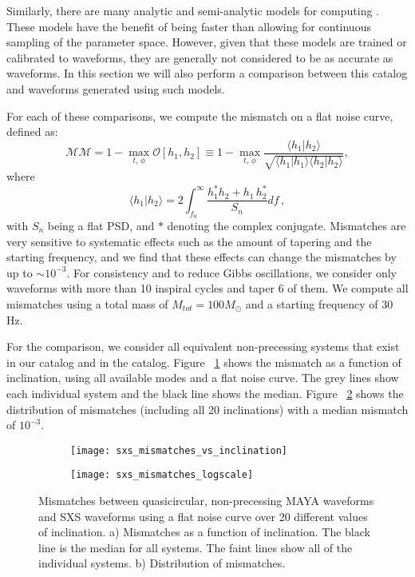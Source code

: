 \documentclass[
twocolumn,prd,
showpacs,
nofootinbib,
amsmath,amssymb,
superscriptaddress]{revtex4-1}
\begin{document}
Similarly, there are many analytic and semi-analytic models for computing . 
These models have the benefit of being faster than \nr{} allowing for continuous sampling of the parameter space.
However, given that these models are trained or calibrated to \nr{} waveforms, they are generally not considered to be as accurate as \nr{} waveforms.
In this section we will also perform a comparison between this catalog and waveforms generated using such models.

For each of these comparisons, we compute the mismatch on a flat noise curve, defined as:
\begin{equation}
\mathcal{MM} = 1 - \max_{t,\, \phi} \mathcal O[h_1, h_2]  \equiv  1 - \max_{t,\, \phi} \frac{\langle h_1|h_2 \rangle}{\sqrt{\langle h_1|h_1\rangle \langle h_2|h_2\rangle}},  \label{eq:overlap}
\end{equation}
where
\begin{equation}
\langle h_1|h_2 \rangle = 2\int_{f_{0}}^\infty\frac{h_1^*h_2 +h_1\,h_2^*}{S_n} df\,,
\end{equation}
with $S_n$ being a flat PSD, and $*$ denoting the complex conjugate.
Mismatches are very sensitive to systematic effects such as the amount of tapering and the starting frequency, and we 
find that these effects can change the mismatches by up to $\sim 10^{-3}$.
For consistency and to reduce Gibbs oscillations, we consider only waveforms with more than 10 inspiral cycles and taper 6 of them. 
We compute all mismatches using a total mass of $M_{tot} = 100 M_\odot$ and a starting frequency of 30 Hz.

For the \sxs{} comparison, we consider all equivalent non-precessing systems that exist in our catalog and in the \sxs{} \lvk{} catalog. 
Figure ~\ref{fig:sxs_mismatches_vs_inclination} shows the mismatch as a function of inclination, using all available modes and a flat noise curve. 
The grey lines show each individual system and the black line shows the median. 
Figure ~\ref{fig:sxs_mismatch_distribution} shows the distribution of mismatches (including all 20 inclinations) with a median mismatch of $10^{-3}$.

\begin{figure*}
\centering
\begin{subfigure}[t]{.48\textwidth}
    \centering
   \texttt{[image: sxs\_mismatches\_vs\_inclination]}
    \caption{}
    \label{fig:sxs_mismatches_vs_inclination}
\end{subfigure}
\begin{subfigure}[t]{.48\textwidth}
    \centering
    \texttt{[image: sxs\_mismatches\_logscale]}
 	\caption{}
 	\label{fig:sxs_mismatch_distribution}
\end{subfigure}
\caption{Mismatches between quasicircular, non-precessing MAYA waveforms and SXS waveforms using a flat noise curve over 20 different values of inclination. a) Mismatches as a function of inclination.  The black line is the median for all systems. The faint lines show all of the individual systems.  b) Distribution of mismatches.} 
\label{fig:sxs_mismatches}
\end{figure*}
\end{document}
